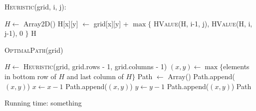 \documentclass[12pt,letterpaper]{article}
\begin{document}
\textsc{Heuristic}(grid, i, j):
\begin{algorithmic}
\State $H \gets$ Array2D()
		\State H[x][y] $\gets$ grid[x][y] + $\max \{$ \textsc{HValue}(H, i-1, j), \textsc{HValue}(H, i, j-1), 0  $\}$
	\EndFor
\EndFor
\State \Return H
\end{algorithmic}

\newpage

\textsc{OptimalPath}(grid)
\begin{algorithmic}
\State $H \gets$ \textsc{Heuristic}(grid, grid.rows - 1, grid.columns - 1)
\State $(x, y) \gets \max \{ $elements in bottom row of $H$ and last column of $H \}$
\State Path $\gets$ Array()
\State Path.append($(x, y)$)
		\State $x \gets x - 1$
		\State Path.append($(x, y)$)
	\Else
		\State $y \gets y - 1$
		\State Path.append($(x, y)$)
	\EndIf 
\EndWhile
\State \Return Path
\end{algorithmic}

Running time: something
\end{document}
